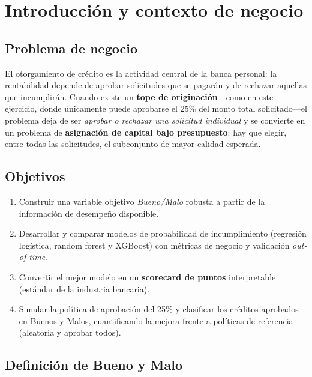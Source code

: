 \documentclass[11pt, letterpaper]{article}
\newcommand{\bt}[1]{\textbf{#1}}
\begin{document}
\newpage
\tableofcontents
\newpage

\section{Introducción y contexto de negocio}

\subsection{Problema de negocio}

El otorgamiento de crédito es la actividad central de la banca personal: la
rentabilidad depende de aprobar solicitudes que se pagarán y de rechazar
aquellas que incumplirán. Cuando existe un \bt{tope de originación}---como en
este ejercicio, donde únicamente puede aprobarse el 25\% del monto total
solicitado---el problema deja de ser \emph{aprobar o rechazar una solicitud
individual} y se convierte en un problema de \bt{asignación de capital bajo
presupuesto}: hay que elegir, entre todas las solicitudes, el subconjunto de
mayor calidad esperada.

\subsection{Objetivos}

\begin{enumerate}
  \item Construir una variable objetivo \emph{Bueno/Malo} robusta a partir
        de la información de desempeño disponible.
  \item Desarrollar y comparar modelos de probabilidad de incumplimiento
        (regresión logística, random forest y XGBoost) con métricas de
        negocio y validación \emph{out-of-time}.
  \item Convertir el mejor modelo en un \bt{scorecard de puntos}
        interpretable (estándar de la industria bancaria).
  \item Simular la política de aprobación del 25\% y clasificar los créditos
        aprobados en Buenos y Malos, cuantificando la mejora frente a
        políticas de referencia (aleatoria y aprobar todos).
\end{enumerate}

\subsection{Definición de Bueno y Malo}
\end{document}
